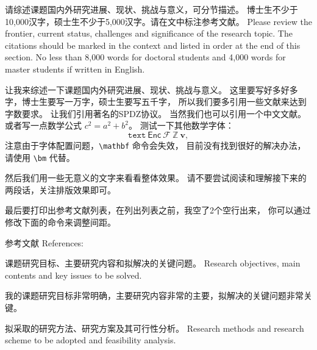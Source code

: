 \documentclass[a4paper,zihao=-4,AutoFakeBold]{ctexart}
\begin{document}
\begin{requirement}
    请综述课题国内外研究进展、现状、挑战与意义，可分节描述。
    博士生不少于10,000汉字，硕士生不少于5,000汉字。请在文中标注参考文献。 
    Please review the frontier, current status, 
    challenges and significance of the research topic. 
    The citations should be marked in the context 
    and listed in order at the end of this section. 
    No less than 8,000 words for doctoral students 
    and 4,000 words for master students if written in English.
\end{requirement}

\begin{content}
    让我来综述一下课题国内外研究进展、现状、挑战与意义。
    这里要写好多好多字，博士生要写一万字，硕士生要写五千字，
    所以我们要多引用一些文献来达到字数要求。
    让我们引用著名的SPDZ协议\cite{SPDZ}。
    当然我们也可以引用一个中文文献\cite{ZJSD}。
    或者写一点数学公式 $c^2 = a^2 + b^2$。
    测试一下其他数学字体：
    \[
        \mathtt{text}\ \mathsf{Enc}\ \mathcal{F}\ \mathbb{Z}\ \bm{v},
    \]
    注意由于字体配置问题，\verb|\mathbf| 命令会失效，
    目前没有找到很好的解决办法，请使用 \verb|\bm| 代替。

    然后我们用一些无意义的文字来看看整体效果。
    请不要尝试阅读和理解接下来的两段话，关注排版效果即可。

    \zhlipsum[1-2]

    最后要打印出参考文献列表，在列出列表之前，我空了2个空行出来，
    你可以通过修改下面的命令来调整间距。

    \vspace{2\baselineskip}
    \linespread{1.25}\selectfont %
    参考文献 References: 
    \printbibliography[heading=none]
\end{content}


\begin{requirement}
    课题研究目标、主要研究内容和拟解决的关键问题。 
    Research objectives, main contents and key issues to be solved.
\end{requirement}

\begin{content}
    我的课题研究目标非常明确，主要研究内容非常的主要，拟解决的关键问题非常关键。
\end{content}


\begin{requirement}
    拟采取的研究方法、研究方案及其可行性分析。
    Research methods and research scheme to be adopted 
    and feasibility analysis.
\end{requirement}
\end{document}
